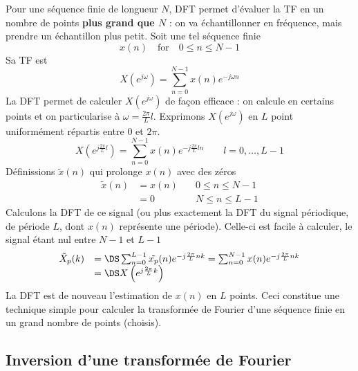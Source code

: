 	Pour une séquence finie de longueur $N$, DFT permet d'évaluer la TF en un nombre de  points 
	\textbf{plus grand que $N$} : on va échantillonner en fréquence, mais prendre un échantillon 
	plus petit. Soit une tel séquence finie
	\begin{equation}
	x(n) \quad \text{for} \quad 0\leq n \leq N-1
	\end{equation}
	Sa TF est 
	\begin{equation}
	X(e^{j\omega}) = \sum_{n=0}^{N-1} x(n)e^{-j\omega n}
	\end{equation}
	La DFT permet de calculer $X(e^{j\omega})$ de façon efficace : on calcule en certains points 
	et on particularise à $\omega=\frac{2\pi}{L}l$. Exprimons $X(e^{j\omega})$ en $L$ point uniformément 
	répartis entre 0 et $2\pi$.
	\begin{equation}
	X\left(e^{j\frac{2\pi}{L}l}\right) = \sum_{n=0}^{N-1}x(n)e^{-j\frac{2\pi}{L}ln}\qquad l=0,\dots,L-1
	\end{equation}
	Définissions $\tilde{x}(n)$ qui prolonge $x(n)$ avec des zéros
	\begin{equation}
	\begin{array}{lll}
	\tilde{x}(n) &= x(n) &\quad 0\leq n\leq N-1\\
	&=0&\quad N\leq n\leq L-1
	\end{array}
	\end{equation}
	Calculons la DFT de ce signal (ou plus exactement la DFT du signal périodique, de période $L$,
	dont $x(n)$ représente une période). Celle-ci est facile à calculer, le signal étant nul entre 
	$N-1$ et $L-1$
	\begin{equation}
	\begin{array}{ll}
	\tilde{X}_p(k) &=\DS \sum_{n=0}^{L-1} \tilde{x_p}(n)e^{-j\frac{2\pi}{L}nk} = \sum_{n=0}^{N-1} 
	x(n)e^{-j\frac{2\pi}{L}nk}\\
	&=\DS X\left(e^{j\frac{2\pi}{L}k}\right)
	\end{array}
	\end{equation}
	La DFT est de nouveau l'estimation de $x(n)$ en $L$ points. Ceci constitue une technique simple pour 
	calculer la transformée de Fourier d'une séquence finie en un grand nombre de points (choisis).
	
	
	\subsection{Inversion d'une transformée de Fourier}
